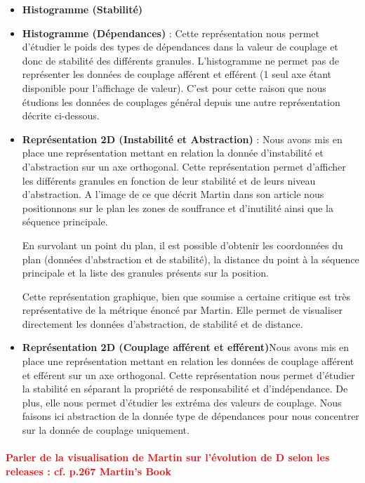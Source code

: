 \documentclass{scrartcl}
\newcommand{\TODO}[1] {
    \noindent \paragraph{\textcolor{red}{#1}}
}
\begin{document}
        \begin{itemize}
        \item \textbf{Histogramme (Stabilité)}
        \item \textbf{Histogramme (Dépendances)} : Cette représentation nous permet d'étudier le poids des types de dépendances dans la valeur de couplage et donc de stabilité des différents granules. L'histogramme ne permet pas de représenter les données de couplage afférent et efférent (1 seul axe étant disponible pour l'affichage de valeur). C'est pour cette raison que nous étudions les données de couplages général depuis une autre représentation décrite ci-dessous.

        \item \textbf{Représentation 2D (Instabilité et Abstraction)} : Nous avons mis en place une représentation mettant en relation la donnée d'instabilité et d'abstraction sur un axe orthogonal. Cette représentation permet d'afficher les différents granules en fonction de leur stabilité et de leurs niveau d'abstraction. 
        A l'image de ce que décrit Martin dans son article nous positionnons sur le plan les zones de souffrance et d'inutilité ainsi que la séquence principale. 
        
        En survolant un point du plan, il est possible d'obtenir les coordonnées du plan (données d'abstraction et de stabilité), la distance du point à la séquence principale et la liste des granules présents sur la position.
        
        Cette représentation graphique, bien que soumise a certaine critique est très représentative de la métrique énoncé par Martin. Elle permet de visualiser directement les données d'abstraction, de stabilité et de distance.

        \item \textbf{Représentation 2D (Couplage afférent et efférent)}Nous avons mis en place une représentation mettant en relation les données de couplage afférent et efférent sur un axe orthogonal. Cette représentation nous permet d'étudier la stabilité en séparant la propriété de responsabilité et d'indépendance. De plus, elle nous permet d'étudier les extréma des valeurs de couplage. Nous faisons ici abstraction de la donnée type de dépendances pour nous concentrer sur la donnée de couplage uniquement.
    \end{itemize}
    
    
    \TODO{Parler de la visualisation de Martin sur l'évolution de D selon les releases : cf. p.267 Martin's Book}
\end{document}
